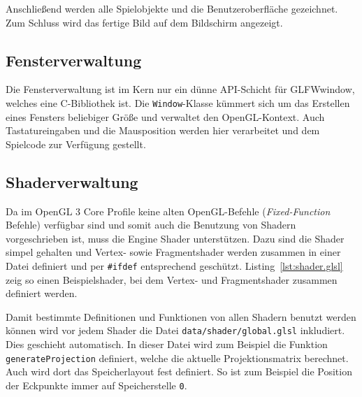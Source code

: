 \documentclass[12pt, a4paper, titlepage, hidelinks]{scrreprt}
\begin{document}
Anschließend werden alle Spielobjekte und die Benutzeroberfläche gezeichnet. Zum Schluss wird das fertige Bild auf dem Bildschirm angezeigt.


\subsection{Fensterverwaltung}

Die Fensterverwaltung ist im Kern nur ein dünne API-Schicht für GLFWwindow, welches eine C-Bibliothek ist. Die \texttt{Window}-Klasse kümmert sich um das Erstellen eines Fensters beliebiger Größe und verwaltet den OpenGL-Kontext. Auch Tastatureingaben und die Mausposition werden hier verarbeitet und dem Spielcode zur Verfügung gestellt.


\subsection{Shaderverwaltung}

Da im OpenGL 3 Core Profile keine alten OpenGL-Befehle (\textit{Fixed-Function} Befehle) verfügbar sind und somit auch die Benutzung von Shadern vorgeschrieben ist, muss die Engine Shader unterstützen. Dazu sind die Shader simpel gehalten und Vertex- sowie Fragmentshader werden zusammen in einer Datei definiert und per \texttt{\#ifdef} entsprechend geschützt. Listing~\autoref{lst:shader.glsl} zeig so einen Beispielshader, bei dem Vertex- und Fragmentshader zusammen definiert werden. 


Damit bestimmte Definitionen und Funktionen von allen Shadern benutzt werden können wird vor jedem Shader die Datei \texttt{data/shader/global.glsl} inkludiert. Dies geschieht automatisch. In dieser Datei wird zum Beispiel die Funktion \texttt{generateProjection} definiert, welche die aktuelle Projektionsmatrix berechnet. Auch wird dort das Speicherlayout fest definiert. So ist zum Beispiel die Position der Eckpunkte immer auf Speicherstelle \texttt{0}.
\end{document}
